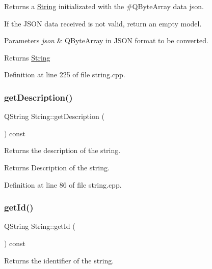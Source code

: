 Returns a \mbox{\hyperlink{classString}{String}} initializated with the \#\+Q\+Byte\+Array data json. 

If the J\+S\+ON data received is not valid, return an empty model. 
\begin{DoxyParams}{Parameters}
{\em json} & Q\+Byte\+Array in J\+S\+ON format to be converted. \\
\hline
\end{DoxyParams}
\begin{DoxyReturn}{Returns}
\mbox{\hyperlink{classString}{String}} 
\end{DoxyReturn}


Definition at line 225 of file string.\+cpp.

\mbox{\label{classString_ae604e3af13ef6ba3113a7484edfc3c55}} 
\subsubsection{\texorpdfstring{get\+Description()}{getDescription()}}
{\footnotesize\ttfamily Q\+String String\+::get\+Description (\begin{DoxyParamCaption}{ }\end{DoxyParamCaption}) const}



Returns the description of the string. 

\begin{DoxyReturn}{Returns}
Description of the string. 
\end{DoxyReturn}


Definition at line 86 of file string.\+cpp.

\mbox{\label{classString_ab32615121278a445dba468c7ef18ee7a}} 
\subsubsection{\texorpdfstring{get\+Id()}{getId()}}
{\footnotesize\ttfamily Q\+String String\+::get\+Id (\begin{DoxyParamCaption}{ }\end{DoxyParamCaption}) const}



Returns the identifier of the string. 

